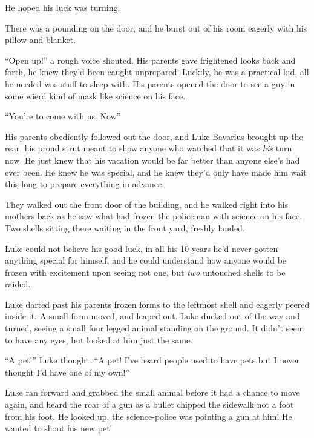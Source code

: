 He hoped his luck was turning.



There was a pounding on the door, and he burst out of his room
eagerly with his pillow and blanket.



``Open up!'' a rough voice shouted. His parents gave frightened looks
back and forth, he knew they'd been caught unprepared. Luckily, he
was a practical kid, all he needed was stuff to sleep with. His
parents opened the door to see a guy in some wierd kind of mask
like science on his face.



``You're to come with us. Now''



His parents obediently followed out the door, and Luke Bavarius
brought up the rear, his proud strut meant to show anyone who
watched that it was {\em his} turn now. He just knew that his
vacation would be far better than anyone else's had ever been. He
knew he was special, and he knew they'd only have made him wait
this long to prepare everything in advance.



They walked out the front door of the building, and he walked right
into his mothers back as he saw what had frozen the policeman with
science on his face. Two shells sitting there waiting in the front
yard, freshly landed.



Luke could not believe his good luck, in all his 10 years he'd
never gotten anything special for himself, and he could understand
how anyone would be frozen with excitement upon seeing not one, but
{\em two} untouched shells to be raided.



Luke darted past his parents frozen forms to the leftmost shell and
eagerly peered inside it. A small form moved, and leaped out. Luke
ducked out of the way and turned, seeing a small four legged animal
standing on the ground. It didn't seem to have any eyes, but looked
at him just the same.



``A pet!'' Luke thought. ``A pet! I've heard people used to have pets
but I never thought I'd have one of my own!''



Luke ran forward and grabbed the small animal before it had a
chance to move again, and heard the roar of a gun as a bullet
chipped the sidewalk not a foot from his foot. He looked up, the
science-police was pointing a gun at him! He wanted to shoot his
new pet!




